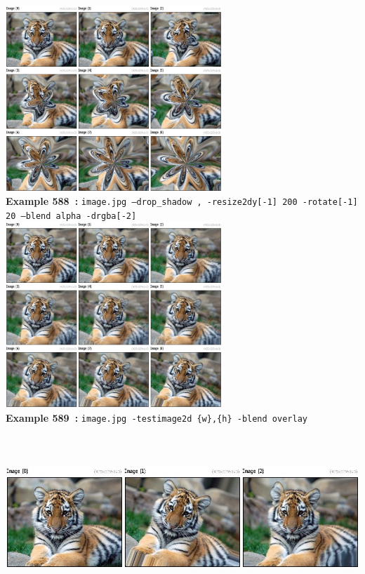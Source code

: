 \documentclass[a4paper,11pt,twoside]{book}
\begin{document}
\begin{center}\includegraphics[keepaspectratio=true,height=7cm,width=\textwidth]{img/gmic_def588.jpg}\\
{\footnotesize \textbf{Example 588~:} \texttt{image.jpg --drop\_shadow , -resize2dy[-1] 200 -rotate[-1] 20 --blend alpha -drgba[-2]}}
\\\includegraphics[keepaspectratio=true,height=7cm,width=\textwidth]{img/gmic_def589.jpg}\\
{\footnotesize \textbf{Example 589~:} \texttt{image.jpg -testimage2d \{w\},\{h\} -blend overlay}}
\\\includegraphics[keepaspectratio=true,height=7cm,width=\textwidth]{img/gmic_def590.jpg}\\

\end{center}
\end{document}

